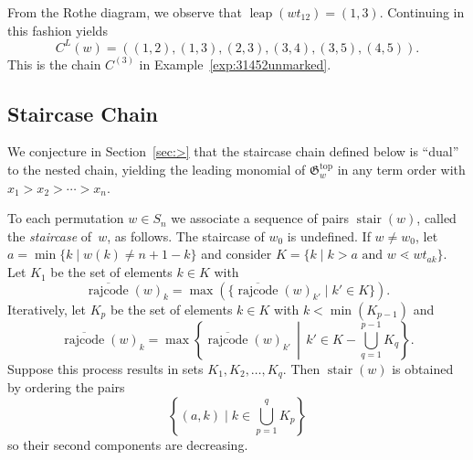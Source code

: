 \documentclass[ALCO]{cedram}
\DeclareMathOperator{\leap}{\mathrm{leap}}
\DeclareMathOperator{\stair}{\mathrm{stair}}
\DeclareMathOperator{\rr}{\mathrm{rajcode}}
\newcommand{\orr}{\overline{\rr}}
\newcommand{\CL}{C^L}
\begin{document}
\begin{example}
\begin{center}
	\end{center}
	From the Rothe diagram, we observe that $\leap(wt_{12}) = (1,3)$. Continuing in this fashion yields 
	\[\CL(w)=((1,2),(1,3),(2,3),(3,4),(3,5),(4,5)). \]
	This is the chain $C^{(3)}$ in Example~\ref{exp:31452unmarked}.
\end{example}

\subsection{Staircase Chain}	

We conjecture in Section~\ref{sec:>} that the staircase chain defined below is ``dual'' to the nested chain, yielding the leading monomial of $\mathfrak{G}_w^{\mathrm{top}}$ in any term order with $x_1>x_2>\cdots>x_n$. 

\begin{definition}
	To each permutation $w\in S_n$ we associate a sequence of pairs $\stair(w)$, called the \emph{staircase} of~$w$, as follows. The staircase of $w_0$ is undefined. If $w\neq w_0$, let
	$a=\min\{k\mid w(k)\neq n+1-k\}$ and consider $K=\{k\mid k>a\mbox{ and }w\lessdot wt_{ak}\}$.
	Let $K_1$ be the set of elements $k\in K$ with
	\[\orr(w)_k=\max(\{\orr(w)_{k'}\mid k'\in K \}).\]
	Iteratively, let $K_p$ be the set of elements $k\in K$ with $k<\min(K_{p-1})$ and
	\[\orr(w)_k=\max\left\{\orr(w)_{k'}\,\middle|\, k'\in K-\bigcup_{q=1}^{p-1}K_q \right\}.\]
	Suppose this process results in sets $K_1,K_2,\ldots,K_q$.		
	Then $\stair(w)$ is obtained by ordering the pairs
	\[\left\{(a,k)\mid k\in \bigcup_{p=1}^q K_p\right\} \]
	so their second components are decreasing.
\end{definition}
\end{document}
